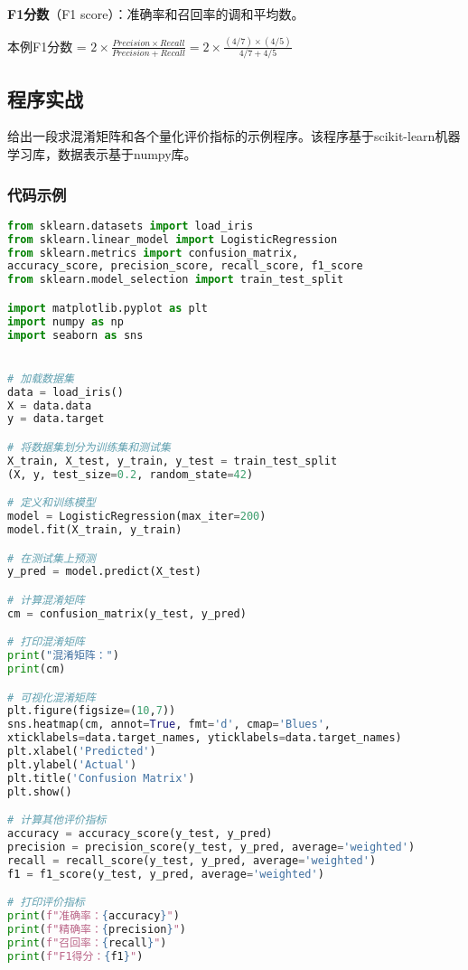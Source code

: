 \textbf{F1分数}（F1 score）：准确率和召回率的调和平均数。

本例F1分数 = $ 2 \times \frac{Precision \times Recall}{Precision + Recall} = 2 \times \frac{(4/7) \times (4/5)}{4/7+4/5}$

\subsection{程序实战}

给出一段求混淆矩阵和各个量化评价指标的示例程序。该程序基于scikit-learn机器学习库，数据表示基于numpy库。

\subsubsection{代码示例}

\begin{lstlisting}[language=python]
from sklearn.datasets import load_iris
from sklearn.linear_model import LogisticRegression
from sklearn.metrics import confusion_matrix, 
accuracy_score, precision_score, recall_score, f1_score
from sklearn.model_selection import train_test_split

import matplotlib.pyplot as plt
import numpy as np
import seaborn as sns


# 加载数据集
data = load_iris()
X = data.data
y = data.target

# 将数据集划分为训练集和测试集
X_train, X_test, y_train, y_test = train_test_split
(X, y, test_size=0.2, random_state=42)

# 定义和训练模型
model = LogisticRegression(max_iter=200)
model.fit(X_train, y_train)

# 在测试集上预测
y_pred = model.predict(X_test)

# 计算混淆矩阵
cm = confusion_matrix(y_test, y_pred)

# 打印混淆矩阵
print("混淆矩阵：")
print(cm)

# 可视化混淆矩阵
plt.figure(figsize=(10,7))
sns.heatmap(cm, annot=True, fmt='d', cmap='Blues', 
xticklabels=data.target_names, yticklabels=data.target_names)
plt.xlabel('Predicted')
plt.ylabel('Actual')
plt.title('Confusion Matrix')
plt.show()

# 计算其他评价指标
accuracy = accuracy_score(y_test, y_pred)
precision = precision_score(y_test, y_pred, average='weighted')
recall = recall_score(y_test, y_pred, average='weighted')
f1 = f1_score(y_test, y_pred, average='weighted')

# 打印评价指标
print(f"准确率：{accuracy}")
print(f"精确率：{precision}")
print(f"召回率：{recall}")
print(f"F1得分：{f1}")
\end{lstlisting}

